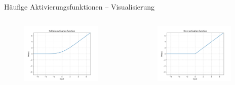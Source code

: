 \documentclass[aspectratio=1610, xcolor=dvipsnames, 9pt]{beamer}
\begin{document}
      \begin{frame}{Häufige Aktivierungsfunktionen -- Visualisierung}
        \begin{columns}
          \begin{column}{0.5\textwidth}
            \begin{figure}
              \centering
                          \includegraphics[width=0.9\textwidth]{images/Softplus.png}
              \end{figure}
          \end{column}
           \begin{column}{0.5\textwidth}
             \begin{figure}
               \centering
                           \includegraphics[width=0.9\textwidth]{images/ReLU.png}
               \end{figure}
           \end{column}
        \end{columns}
      \end{frame}
\end{document}
